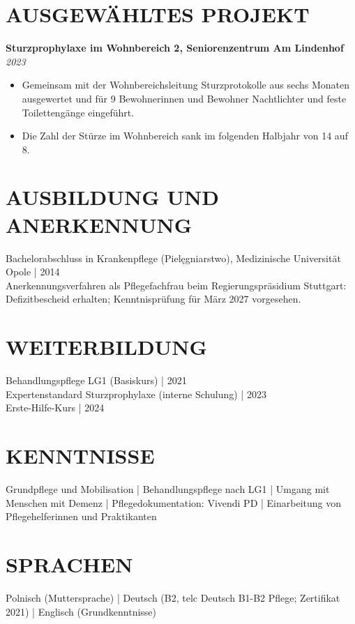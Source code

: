 \documentclass[11pt,a4paper]{article}
\begin{document}
\section*{AUSGEWÄHLTES PROJEKT}
\textbf{Sturzprophylaxe im Wohnbereich 2, Seniorenzentrum Am Lindenhof} \hfill \textit{2023}
\begin{itemize}
\item Gemeinsam mit der Wohnbereichsleitung Sturzprotokolle aus sechs Monaten ausgewertet und für 9 Bewohnerinnen und Bewohner Nachtlichter und feste Toilettengänge eingeführt.
\item Die Zahl der Stürze im Wohnbereich sank im folgenden Halbjahr von 14 auf 8.
\end{itemize}

\section*{AUSBILDUNG UND ANERKENNUNG}
Bachelorabschluss in Krankenpflege (Pielęgniarstwo), Medizinische Universität Opole | 2014\\
Anerkennungsverfahren als Pflegefachfrau beim Regierungspräsidium Stuttgart: Defizitbescheid erhalten; Kenntnisprüfung für März 2027 vorgesehen.

\section*{WEITERBILDUNG}
Behandlungspflege LG1 (Basiskurs) | 2021\\
Expertenstandard Sturzprophylaxe (interne Schulung) | 2023\\
Erste-Hilfe-Kurs | 2024

\section*{KENNTNISSE}
Grundpflege und Mobilisation | Behandlungspflege nach LG1 | Umgang mit Menschen mit Demenz | Pflegedokumentation: Vivendi PD | Einarbeitung von Pflegehelferinnen und Praktikanten

\section*{SPRACHEN}
Polnisch (Muttersprache) | Deutsch (B2, telc Deutsch B1-B2 Pflege; Zertifikat 2021) | Englisch (Grundkenntnisse)
\end{document}
